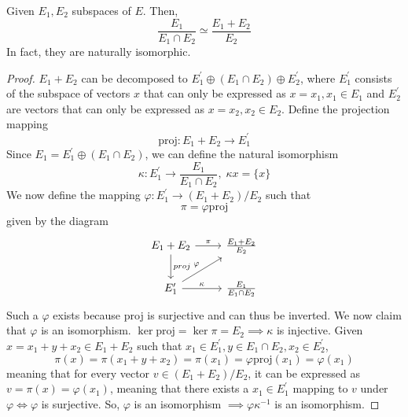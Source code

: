 \documentclass{article}
\begin{document}
    \begin{proposition}
      Given $E_1, E_2$ subspaces of $E$. Then, 
      \begin{equation}
        \frac{E_1}{E_1 \cap E_2} \simeq \frac{E_1 + E_2}{E_2}
      \end{equation}
      In fact, they are naturally isomorphic. 
    \end{proposition}
    \begin{proof}
      $E_1 + E_2$ can be decomposed to $E_1^\prime \oplus (E_1 \cap E_2) \oplus E_2^\prime$, where $E_1^\prime$ consists of the subspace of vectors $x$ that can only be expressed as $x = x_1, x_1 \in E_1$ and $E_2^\prime$ are vectors that can only be expressed as $x = x_2, x_2 \in E_2$. Define the projection mapping
      \begin{equation}
        \text{proj}: E_1 + E_2 \longrightarrow E_1^\prime
      \end{equation}
      Since $E_1 = E_1^\prime \oplus (E_1 \cap E_2)$, we can define the natural isomorphism 
      \begin{equation}
        \kappa: E_1^\prime \longrightarrow \frac{E_1}{E_1 \cap E_2}, \; \kappa{x} = \{x\}
      \end{equation}
      We now define the mapping $\varphi: E_1^\prime \longrightarrow (E_1 + E_2) / E_2$ such that
      \begin{equation}
        \pi = \varphi \text{proj}
      \end{equation}
      given by the diagram 
      \[\begin{tikzcd} 
          E_1 + E_2 \arrow{d}{proj} \arrow{r}{\pi} & \frac{E_1 + E_2}{E_2} \\
          E_1^\prime \arrow{ru}{\varphi} \arrow{r}{\kappa} & \frac{E_1}{E_1 \cap E_2}
      \end{tikzcd}\]
      Such a $\varphi$ exists because proj is surjective and can thus be inverted. We now claim that $\varphi$ is an isomorphism. $\ker{\text{proj}} = \ker{\pi} = E_2 \implies \kappa$ is injective. Given $x = x_1 + y + x_2 \in E_1 + E_2$ such that $x_1 \in E_1^\prime, y \in E_1 \cap E_2, x_2 \in E_2^\prime$, 
      \begin{equation}
        \pi(x) = \pi(x_1 + y + x_2) = \pi(x_1) = \varphi \text{proj} (x_1) = \varphi (x_1)
      \end{equation}
      meaning that for every vector $v \in (E_1 + E_2) / E_2$, it can be expressed as $v = \pi (x) = \varphi (x_1)$, meaning that there exists a $x_1 \in E_1^\prime$ mapping to $v$ under $\varphi \iff \varphi$ is surjective. So, $\varphi$ is an isomorphism $\implies \varphi \kappa^{-1}$ is an isomorphism.  
    \end{proof}
\end{document}
